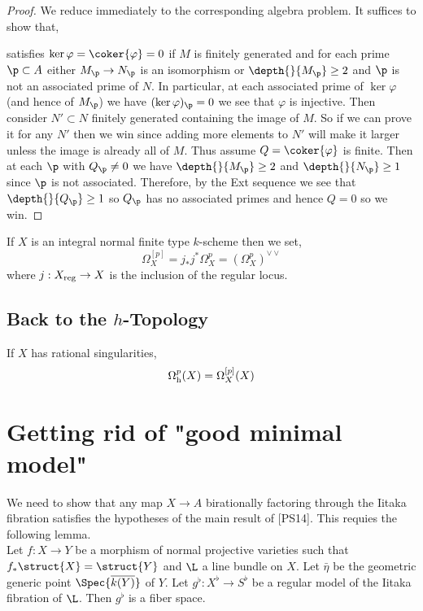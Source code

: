 \documentclass[12pt]{article}
\begin{document}
\begin{proof}
We reduce immediately to the corresponding algebra problem. It suffices to show that,
\begin{center}
\end{center}
satisfies $\ker{\varphi} = \coker{\varphi} = 0$ if $M$ is finitely generated and for each prime $\p \subset A$ either $M_\p \to N_\p$ is an isomorphism or $\depth{}{M_\p} \ge 2$ and $\p$ is not an associated prime of $N$. In particular, at each associated prime of $\ker{\varphi}$ (and hence of $M_\p$) we have $(\ker{\varphi})_\p = 0$ we see that $\varphi$ is injective. Then consider $N' \subset N$ finitely generated containing the image of $M$. So if we can prove it for any $N'$ then we win since adding more elements to $N'$ will make it larger unless the image is already all of $M$. Thus assume $Q = \coker{\varphi}$ is finite. Then at each $\p$ with $Q_\p \neq 0$ we have $\depth{}{M_\p} \ge 2$ and $\depth{}{N_\p} \ge 1$ since $\p$ is not associated. Therefore, by the Ext sequence we see that $\depth{}{Q_\p} \ge 1$ so $Q_\p$ has no associated primes and hence $Q = 0$ so we win.
\end{proof}

\begin{defn}
If $X$ is an integral normal finite type $k$-scheme then we set,
\[ \Omega^{[p]}_X  = j_* j^* \Omega_X^p = (\Omega_X^p)^{\vee \vee} \]
where $j : X_{\mathrm{reg}} \to X$ is the inclusion of the regular locus.
\end{defn}

\subsection{Back to the $h$-Topology}

\begin{theorem}
If $X$ has rational singularities,
\[ \Omega^p_{\mathrm{h}}(X) = \Omega^{[p]}_X(X) \]
\end{theorem}

\section{Getting rid of "good minimal model"}

We need to show that any map $X \to A$ birationally factoring through the Iitaka fibration satisfies the hypotheses of the main result of [PS14]. This requies the following lemma.
\bigskip\\
Let $f : X \to Y$ be a morphism of normal projective varieties such that $f_* \struct{X} = \struct{Y}$ and $\L$ a line bundle on $X$. Let $\bar{\eta}$ be the geometric generic point $\Spec{\overline{k(Y)}}$ of $Y$. Let $g^{\flat} : X^\flat \to S^\flat$ be a regular model of the Iitaka fibration of $\L$. Then $g^\flat$ is a fiber space. 
\end{document}
